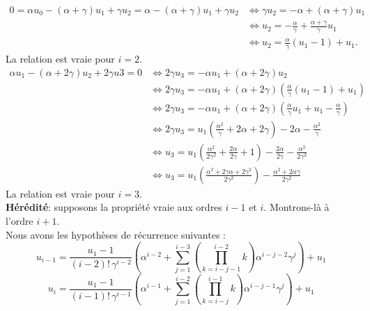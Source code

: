 \documentclass[12pt,a4paper]{report}
\theoremstyle{remark}
\begin{document}
\begin{align*}
0=\alpha u_0 - (\alpha + \gamma) u_1 + \gamma u_2 = \alpha - (\alpha + \gamma) u_1 + \gamma u_2 & \iff \gamma u_2 = - \alpha + (\alpha + \gamma)u_1 \\
&\iff u_2 = - \frac{\alpha}{\gamma} + \frac{\alpha + \gamma}{\gamma} u_1 \\
&\iff u_2 = \frac{\alpha}{\gamma}(u_1 - 1) + u_1.
\end{align*}
La relation est vraie pour $i=2$.
\begin{align*}
\alpha u_1 - (\alpha + 2\gamma) u_2+2\gamma u3 = 0 &\iff 2 \gamma u_3 = -\alpha u_1+ (\alpha + 2\gamma) u_2 \\
& \iff 2 \gamma u_3 = -\alpha u_1 + (\alpha + 2\gamma) \left(\frac{\alpha}{\gamma}(u_1 - 1) + u_1 \right)\\
&\iff 2 \gamma u_3 = -\alpha u_1 + (\alpha + 2\gamma) \left(\frac{\alpha}{\gamma}u_1 +u_1 - \frac{\alpha}{\gamma} \right) \\
&\iff 2 \gamma u_3 = u_1\left(\frac{\alpha^2}{\gamma} +2\alpha  +2\gamma\right) - 2\alpha - \frac{\alpha^2}{\gamma} \\
&\iff  u_3 = u_1\left(\frac{\alpha^2}{2\gamma^2} +\frac{2\alpha}{2\gamma}  +1\right) - \frac{2\alpha}{2\gamma} - \frac{\alpha^2}{2\gamma^2}\\
&\iff  u_3 = u_1\left(\frac{\alpha^2+2\gamma\alpha + 2\gamma^2}{2\gamma^2}\right)- \frac{\alpha^2+ 2\alpha\gamma}{2\gamma^2}
\end{align*}
La relation est vraie pour $i=3$.\\

\textbf{Hérédité}: supposons la propriété vraie aux ordres $i-1$ et $i$. Montrons-là à l'ordre $i+1$.\\

Nous avons les hypothèses de récurrence suivantes : 
$$u_{i-1} = \frac{u_1 - 1}{(i-2)! \, \gamma^{i-2}} \left( \alpha^{i-2} + \sum_{j=1}^{i-3}(\prod_{k=i-j-1}^{i-2} k) \alpha^{i-j-2} \gamma^j \right) + u_1 $$
$$u_i = \frac{u_1 - 1}{(i-1)! \, \gamma^{i-1}} \left( \alpha^{i-1} + \sum_{j=1}^{i-2}(\prod_{k=i-j}^{i-1} k) \alpha^{i-j-1} \gamma^j \right) + u_1 $$
\end{document}
